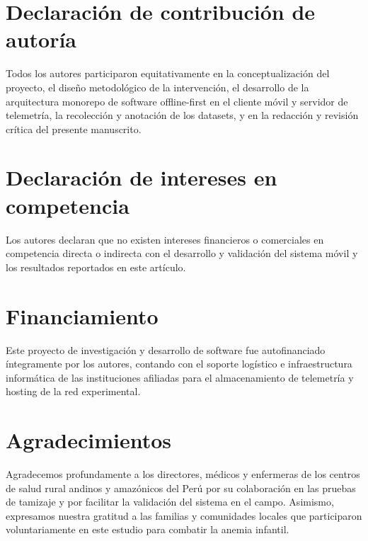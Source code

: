 \section*{Declaración de contribución de autoría}
Todos los autores participaron equitativamente en la conceptualización del proyecto, el diseño metodológico de la intervención, el desarrollo de la arquitectura monorepo de software offline-first en el cliente móvil y servidor de telemetría, la recolección y anotación de los datasets, y en la redacción y revisión crítica del presente manuscrito.

\section*{Declaración de intereses en competencia}
Los autores declaran que no existen intereses financieros o comerciales en competencia directa o indirecta con el desarrollo y validación del sistema móvil y los resultados reportados en este artículo.

\section*{Financiamiento}
Este proyecto de investigación y desarrollo de software fue autofinanciado íntegramente por los autores, contando con el soporte logístico e infraestructura informática de las instituciones afiliadas para el almacenamiento de telemetría y hosting de la red experimental.

\section*{Agradecimientos}
Agradecemos profundamente a los directores, médicos y enfermeras de los centros de salud rural andinos y amazónicos del Perú por su colaboración en las pruebas de tamizaje y por facilitar la validación del sistema en el campo. Asimismo, expresamos nuestra gratitud a las familias y comunidades locales que participaron voluntariamente en este estudio para combatir la anemia infantil.
